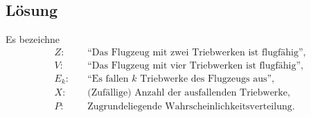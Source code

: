 \documentclass{exercise}
\begin{document}
    \subsection*{Lösung}
    Es bezeichne
    \begin{align*}
        Z: \quad &\text{``Das Flugzeug mit zwei Triebwerken ist flugfähig''},\\
        V: \quad &\text{``Das Flugzeug mit vier Triebwerken ist flugfähig''},\\
        E_k: \quad &\text{``Es fallen }k\text{ Triebwerke des Flugzeugs aus''},\\
        X: \quad &\text{(Zufällige) Anzahl der ausfallenden Triebwerke},\\
        P: \quad &\text{Zugrundeliegende Wahrscheinlichkeitsverteilung}.
    \end{align*}
\end{document}

